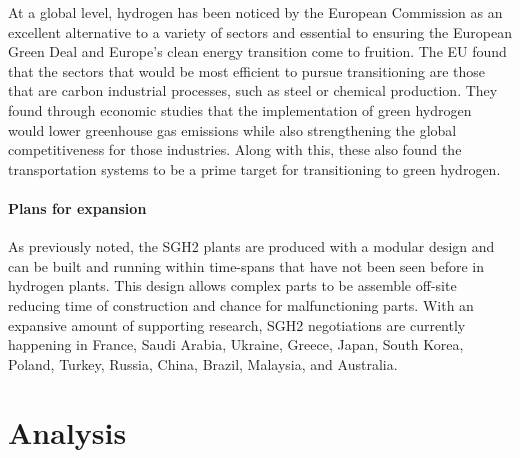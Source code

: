 \documentclass[3p,sort]{elsarticle}
\begin{document}
  
At a global level, hydrogen has been noticed by the European Commission as an excellent 
alternative to a variety of sectors and essential to ensuring the European Green Deal and Europe's 
clean energy transition come to fruition. The EU found that the sectors that would be most efficient 
to pursue transitioning are those that are carbon industrial processes, such as steel or chemical 
production. They found through economic studies that the implementation of green hydrogen would lower 
greenhouse gas emissions while also strengthening the global competitiveness for those industries. 
Along with this, these also found the transportation systems to be a prime target for transitioning 
to green hydrogen.
\citep{forbes, isegoria, eu, expert}

\paragraph{Plans for expansion} As previously noted, the SGH2 plants are produced with a modular design and can be built and running within time-spans that have not been 
seen before in hydrogen plants. This design allows complex parts to be assemble off-site reducing time of construction and chance for 
malfunctioning parts. With an expansive amount of supporting research, SGH2 negotiations are currently happening in France, Saudi Arabia, Ukraine,
Greece, Japan, South Korea, Poland, Turkey, Russia, China, Brazil, Malaysia, and Australia.
\cite{sgh2site}

\section{Analysis}
\end{document}
